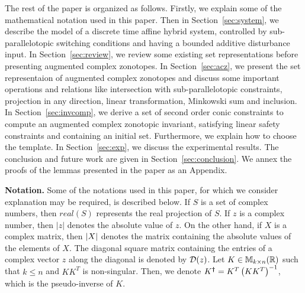 The rest of the paper is organized as follows.  Firstly, we explain
some of the mathematical notation used in this paper.  Then in
Section~\ref{sec:system}, we describe the model of a discrete time
affine hybrid system, controlled by sub-parallelotopic switching
conditions and having a bounded additive disturbance input.  In
Section~\ref{sec:review}, we review some existing set representations
before presenting augmented complex zonotopes.  In
Section~\ref{sec:acz}, we present the set representaion of augmented
complex zonotopes and discuss some important operations and relations
like intersection with sub-parallelotopic constraints, projection in
any direction, linear transformation, Minkowski sum and inclusion.  In
Section~\ref{sec:invcomp}, we derive a set of second order conic
constraints to compute an augmented complex zonotopic invariant,
satisfying linear safety constraints and containing an initial set.
Furthermore, we explain how to choose the template.  In
Section~\ref{sec:exp}, we discuss the experimental results.  The
conclusion and future work are given in
Section~\ref{sec:conclusion}.  We annex the proofs of the lemmas
presented in the paper as an Appendix.

{\bf Notation.} Some of the notations used in this paper, for which we
consider explanation may be required, is described below.  If $S$ is a
set of complex numbers, then $real(S)$ represents the real projection
of $S$.  If $z$ is a complex number, then $|z|$ denotes the absolute
value of $z$.  On the other hand, if $X$ is a complex matrix, then $\left|X\right|$ denotes
the matrix containing the absolute values of the elements of $X$.  The
diagonal square matrix containing the entries of a complex vector $z$
along the diagonal is denoted by $\mathcal{D}(z)$.  Let
$K\in\mathbb{M}_{k\times n}(\mathbb{\mathbb{R}})$ such that $k\leq n$ and $KK^T$ is
non-singular.  Then, we denote $K^{\bm{\dagger}}=K^T\left(KK^T\right)^{-1}$,
which is the pseudo-inverse of $K$.

